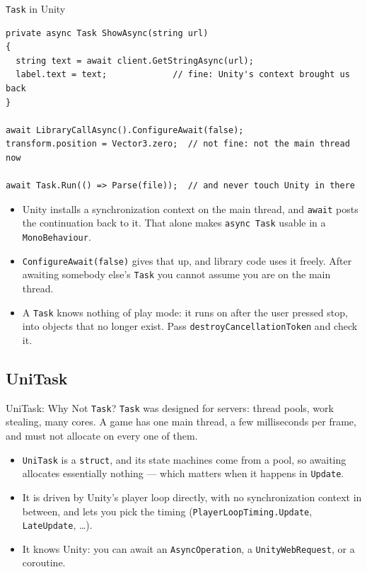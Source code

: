 \begin{frame}[fragile]{\texttt{Task} in Unity}
  \begin{lstlisting}[basicstyle=\scriptsize\ttfamily]
private async Task ShowAsync(string url)
{
  string text = await client.GetStringAsync(url);
  label.text = text;             // fine: Unity's context brought us back
}

await LibraryCallAsync().ConfigureAwait(false);
transform.position = Vector3.zero;  // not fine: not the main thread now

await Task.Run(() => Parse(file));  // and never touch Unity in there
  \end{lstlisting}
  \vspace{0.5ex}

  \begin{itemize}
    \item Unity installs a synchronization context on the main thread, and
      \texttt{await} posts the continuation back to it. That alone makes
      \texttt{async Task} usable in a \texttt{MonoBehaviour}.
    \item \texttt{ConfigureAwait(false)} gives that up, and library code uses
      it freely. After awaiting somebody else's \texttt{Task} you cannot assume
      you are on the main thread.
    \item A \texttt{Task} knows nothing of play mode: it runs on after the user
      pressed stop, into objects that no longer exist. Pass
      \texttt{destroyCancellationToken} and check it.
  \end{itemize}
\end{frame}

\subsection{UniTask}

\begin{frame}{UniTask: Why Not \texttt{Task}?}
  \texttt{Task} was designed for servers: thread pools, work stealing, many
  cores. A game has one main thread, a few milliseconds per frame, and must not
  allocate on every one of them.
  \vspace{1ex}

  \begin{itemize}
    \item \texttt{UniTask} is a \texttt{struct}, and its state machines come
      from a pool, so awaiting allocates essentially nothing --- which matters
      when it happens in \texttt{Update}.
    \item It is driven by Unity's player loop directly, with no
      synchronization context in between, and lets you pick the timing
      (\texttt{PlayerLoopTiming.Update}, \texttt{LateUpdate}, \ldots).
    \item It knows Unity: you can await an \texttt{AsyncOperation}, a
      \texttt{UnityWebRequest}, or a coroutine.
  \end{itemize}
  \vspace{2ex}

\end{frame}

